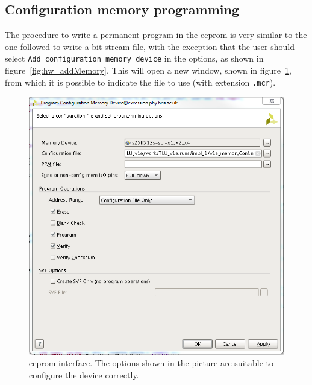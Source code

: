 \subsection{Configuration memory programming}
The procedure to write a permanent program in the \gls{eeprom} is very similar to the one followed to write a bit stream file, with the exception that the user should select \verb"Add configuration memory device" in the options, as shown in figure~\ref{fig:hw_addMemory}.
This will open a new window, shown in figure~\ref{fig:hw_eeprom}, from which it is possible to indicate the file to use (with extension \verb".mcr").
\begin{figure}
  \centering
  \includegraphics[width=.80\textwidth]{./Images/hw_prog.png}
  \caption{\gls{eeprom} interface. The options shown in the picture are suitable to configure the device correctly.}
  \label{fig:hw_eeprom}
\end{figure}



